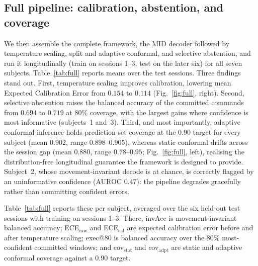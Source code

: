 \documentclass[conference]{IEEEtran}
\begin{document}
\subsection{Full pipeline: calibration, abstention, and coverage}
We then assemble the complete framework, the MID decoder followed by temperature
scaling, split and adaptive conformal, and selective abstention, and run it
longitudinally (train on sessions 1--3, test on the later six) for all seven
subjects. Table~\ref{tab:full} reports means over the test sessions. Three findings
stand out. First, temperature scaling improves calibration, lowering mean Expected
Calibration Error from $0.154$ to $0.114$ (Fig.~\ref{fig:full}, right). Second,
selective abstention raises the balanced accuracy of the committed commands from
$0.694$ to $0.719$ at $80\%$ coverage, with the largest gains where confidence is
most informative (subjects~1 and~3). Third, and most importantly, adaptive conformal
inference holds prediction-set coverage at the $0.90$ target for every subject (mean
$0.902$, range $0.898$--$0.905$), whereas static conformal drifts across the session
gap (mean $0.880$, range $0.78$--$0.95$; Fig.~\ref{fig:full}, left), realising the
distribution-free longitudinal guarantee the framework is designed to provide.
Subject~2, whose movement-invariant decode is at chance, is correctly flagged by an
uninformative confidence (AUROC $0.47$): the pipeline degrades gracefully rather
than committing confident errors.

Table~\ref{tab:full} reports these per subject, averaged over the six held-out test
sessions with training on sessions 1--3. There, invAcc is movement-invariant balanced
accuracy; ECE$_{\text{raw}}$ and ECE$_{\text{cal}}$ are expected calibration error
before and after temperature scaling; exec@80 is balanced accuracy over the $80\%$
most-confident committed windows; and cov$_{\text{stat}}$ and cov$_{\text{adpt}}$ are
static and adaptive conformal coverage against a $0.90$ target.
\end{document}
